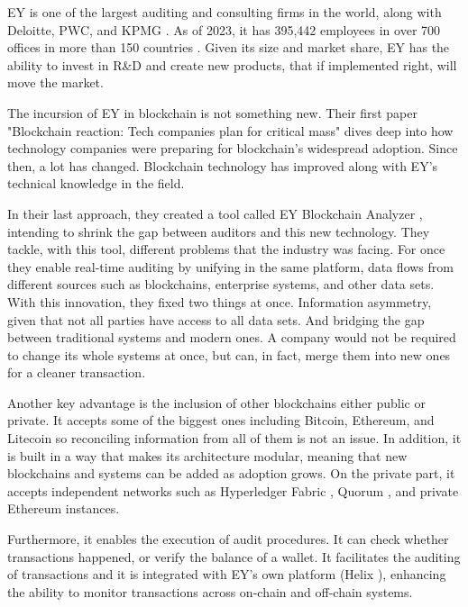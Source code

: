 EY is one of the largest auditing and consulting firms in the world, along with Deloitte, PWC, and KPMG \cite{ey_overview}. As of 2023, it has 395,442 employees in over 700 offices in more than 150 countries \cite{ey_revenue_record}. Given its size and market share, EY has the ability to invest in R\&D and create new products, that if implemented right, will move the market. 

The incursion of EY in blockchain is not something new. Their first paper "Blockchain reaction: Tech companies plan for critical mass" \cite{ey_first_paper} dives deep into how technology companies were preparing for blockchain’s widespread adoption. Since then, a lot has changed. Blockchain technology has improved along with EY's technical knowledge in the field. 

In their last approach, they created a tool called EY Blockchain Analyzer \cite{EYBlockchainAnalyzer}, intending to shrink the gap between auditors and this new technology. They tackle, with this tool, different problems that the industry was facing. For once they enable real-time auditing by unifying in the same platform, data flows from different sources such as blockchains, enterprise systems, and other data sets. With this innovation, they fixed two things at once. Information asymmetry, given that not all parties have access to all data sets. And bridging the gap between traditional systems and modern ones. A company would not be required to change its whole systems at once, but can, in fact, merge them into new ones for a cleaner transaction. 

Another key advantage is the inclusion of other blockchains either public or private. It accepts some of the biggest ones including Bitcoin, Ethereum, and Litecoin so reconciling information from all of them is not an issue. In addition, it is built in a way that makes its architecture modular, meaning that new blockchains and systems can be added as adoption grows. On the private part, it accepts independent networks such as Hyperledger Fabric \cite{hyperledger}, Quorum \cite{quorum_docs}, and private Ethereum instances.

Furthermore, it enables the execution of audit procedures. It can check whether transactions happened, or verify the balance of a wallet. It facilitates the auditing of transactions and it is integrated with EY's own platform (Helix \cite{ey_helix}), enhancing the ability to monitor transactions across on-chain and off-chain systems.

